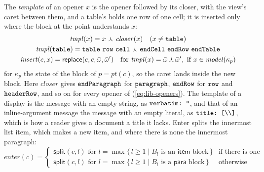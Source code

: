 \documentclass[11pt]{article}
\numberwithin{equation}{section}
\newcommand{\kw}[1]{\ensuremath{\mathsf{#1}}}
\newcommand{\str}[1]{\ensuremath{\text{\texttt{#1}}}}
\newcommand{\bs}{\textbackslash}
\newcommand{\crt}{\mathord{\curlywedge}}
\begin{document}
The \emph{template} of an opener $x$ is the opener followed by its closer,
with the view's caret between them, and a table's holds one row of one
cell; it is inserted only where the block at the point understands $x$:
\begin{equation}\label{eq:lib-templates}
\begin{gathered}
\mathit{tmpl}(x) = x\ \crt\ \mathit{closer}(x) \quad (x \neq \str{table})
\\
\mathit{tmpl}(\str{table}) = \str{table}\ \str{row}\ \str{cell}\ \crt\
  \str{endCell}\ \str{endRow}\ \str{endTable}
\\
\mathit{insert}(c, x) = \kw{replace}(c, c, \bar\omega, \bar\omega') \quad
  \text{for } \mathit{tmpl}(x) = \bar\omega\,\crt\,\bar\omega', \text{ if }
  x \in \mathit{model}(\kappa_p)
\end{gathered}
\end{equation}
for $\kappa_p$ the state of the block of $p = \mathit{pt}(c)$, so the
caret lands inside the new block.  Here $\mathit{closer}$
gives $\str{endParagraph}$ for $\str{paragraph}$, $\str{endRow}$ for
$\str{row}$ and $\str{headerRow}$, and so on for every
opener of (\ref{eq:lib-openers}).  The template of a display is the
message with an empty string, as $\str{verbatim:\ ''}$, and that of an
inline-argument message the message with an empty literal, as
$\str{title:\ [\bs\bs]}$, which is how a reader gives a document a title it
lacks.  Enter splits the innermost list item, which makes a new item, and
where there is none the innermost paragraph:
\begin{equation}\label{eq:lib-enter}
\mathit{enter}(c) =
\begin{cases}
\kw{split}(c, l) \text{ for } l = \max\{\, l \ge 1 \mid B_l \text{ is an }
  \kw{item} \text{ block} \,\} & \text{if there is one} \\
\kw{split}(c, l) \text{ for } l = \max\{\, l \ge 1 \mid B_l \text{ is a }
  \kw{para} \text{ block} \,\} & \text{otherwise}
\end{cases}
\end{equation}
\end{document}

